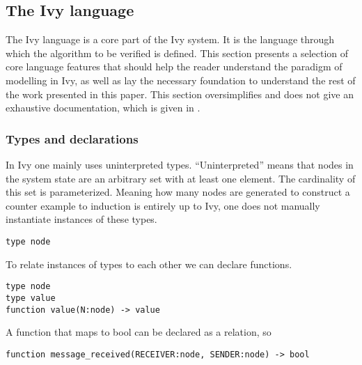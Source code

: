 \documentclass[fleqn]{article}
\begin{document}
\subsection{The Ivy language}
The Ivy language is a core part of the Ivy system. It is the language through which the algorithm to be verified is defined.
This section presents a selection of core language features that should help the reader understand the paradigm of modelling in Ivy, as well as lay the necessary foundation to understand
the rest of the work presented in this paper. This section oversimplifies and does not give an exhaustive documentation, which is given in \cite{refLanguageDoc}.

\subsubsection{Types and declarations}
In Ivy one mainly uses uninterpreted types. ``Uninterpreted'' means that nodes in the system state are an arbitrary set with at least one element. The cardinality of this
set is parameterized.  Meaning how many nodes are generated to construct a counter example to induction is entirely up to Ivy, one does not manually instantiate instances of these types.

\begin{mdframed}[backgroundcolor=light-gray, roundcorner=10pt,leftmargin=1, rightmargin=1, innerleftmargin=15, innertopmargin=15,innerbottommargin=15, outerlinewidth=1, linecolor=light-gray]
\begin{lstlisting}
type node
\end{lstlisting}
\end{mdframed}

\noindent To relate instances of types to each other we can declare functions.

\begin{mdframed}[backgroundcolor=light-gray, roundcorner=10pt,leftmargin=1, rightmargin=1, innerleftmargin=15, innertopmargin=15,innerbottommargin=15, outerlinewidth=1, linecolor=light-gray]
\begin{lstlisting}
type node
type value
function value(N:node) -> value
\end{lstlisting}
\end{mdframed}

\noindent A function that maps to bool can be declared as a relation, so

\begin{mdframed}[backgroundcolor=light-gray, roundcorner=10pt,leftmargin=1, rightmargin=1, innerleftmargin=15, innertopmargin=15,innerbottommargin=15, outerlinewidth=1, linecolor=light-gray]
\begin{lstlisting}
function message_received(RECEIVER:node, SENDER:node) -> bool
\end{lstlisting}
\end{mdframed}
\end{document}
